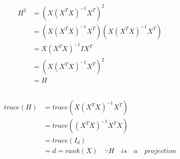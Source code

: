 \documentclass[12pt,a4paper]{article}
\begin{document}
\subsection{}
\begin{align*}
H^2&= (X(X^T X)^{-1}X^T)^2\\
&= (X(X^T X)^{-1}X^T)(X(X^T X)^{-1}X^T) \\
&= X(X^T X)^{-1}IX^T \\
&= (X(X^T X)^{-1}X^T)^2\\
&= H
\end{align*}

\subsection{}
\begin{align*}
trace(H) &= trace(X(X^T X)^{-1}X^T)\\
&= trace((X^T X)^{-1}X^TX)\\
&= trace(I_d) \\
&= d = rank(X)\quad \because H\quad is \quad a \quad projection
\end{align*}
\end{document}
